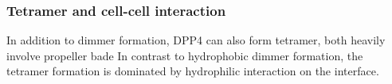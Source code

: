 \subsubsection{Tetramer and cell-cell interaction}

In addition to dimmer formation, DPP4 can also form tetramer, both heavily involve propeller bade  In contrast to hydrophobic dimmer formation, the tetramer formation is dominated by hydrophilic interaction on the interface.~\cite{Engel_2003} 